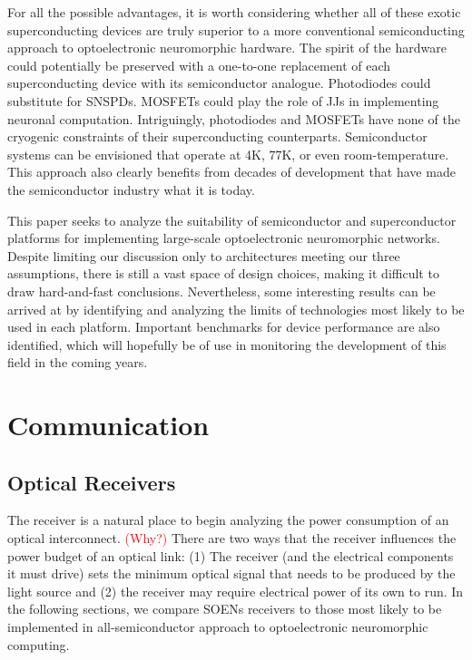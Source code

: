 \documentclass[twocolumn]{article}
\begin{document}
For all the possible advantages, it is worth considering whether all of these exotic superconducting devices are truly superior to a more conventional semiconducting approach to optoelectronic neuromorphic hardware. The spirit of the hardware could potentially be preserved with a one-to-one replacement of each superconducting device with its semiconductor analogue. Photodiodes could substitute for SNSPDs. MOSFETs could play the role of JJs in implementing neuronal computation. Intriguingly, photodiodes and MOSFETs have none of the cryogenic constraints of their superconducting counterparts. Semiconductor systems can be envisioned that operate at 4K, 77K, or even room-temperature. This approach also clearly benefits from decades of development that have made the semiconductor industry what it is today.

This paper seeks to analyze the suitability of semiconductor and superconductor platforms for implementing large-scale optoelectronic neuromorphic networks. Despite limiting our discussion only to architectures meeting our three assumptions, there is still a vast space of design choices, making it difficult to draw hard-and-fast conclusions. Nevertheless, some interesting results can be arrived at by identifying and analyzing the limits of technologies most likely to be used in each platform. Important benchmarks for device performance are also identified, which will hopefully be of use in monitoring the development of this field in the coming years.

\section{\label{sec:communication}Communication}
\subsection{Optical Receivers}
The receiver is a natural place to begin analyzing the power consumption of an optical interconnect. \textcolor{red}{(Why?)} There are two ways that the receiver influences the power budget of an optical link: (1) The receiver (and the electrical components it must drive) sets the minimum optical signal that needs to be produced by the light source and (2) the receiver may require electrical power of its own to run. In the following sections, we compare SOENs receivers \cite{shainline2019superconducting} to those most likely to be implemented in all-semiconductor approach to optoelectronic neuromorphic computing.
\end{document}
